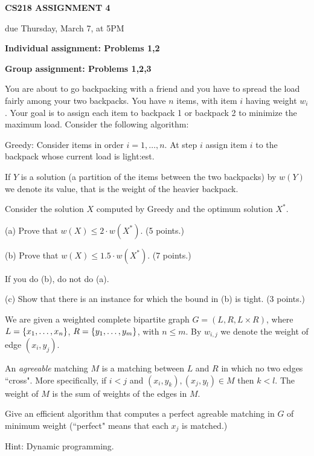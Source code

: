 \documentclass[11pt]{article}
\newcommand{\Greedy}{\mbox{\sc Greedy}}
\begin{document}
\centerline{\large \bf CS218 ASSIGNMENT 4}
\centerline{due Thursday, March 7, at 5PM}

\vskip 0.1in
\noindent
{\bf Individual assignment: Problems 1,2}

\noindent
{\bf Group assignment: Problems 1,2,3}

\vskip 0.1in



\begin{problem}
You are about to go backpacking with a friend and you have to spread the load fairly among your two backpacks. You have $n$ items, with item $i$ having weight $w_i$. Your goal is to assign each item to backpack 1 or backpack 2 to minimize the maximum load. Consider the following algorithm:
%
\begin{description}
\item{{\Greedy}:} Consider items in order $i=1,\dots,n$. At step $i$ assign item $i$ to the backpack whose current load is light:est.
\end{description}
%
If $Y$ is a solution (a partition of the items between the two backpacks) by $w(Y)$ we denote its value, that is the weight of the heavier backpack.

Consider the solution $X$ computed by {\Greedy} and the optimum solution $X^\ast$.

\noindent
(a) Prove that $w(X)\le 2\cdot w(X^\ast)$. (5 points.)

\noindent
(b) Prove that $w(X) \le 1.5\cdot w(X^\ast)$. (7 points.)

If you do (b), do not do (a).

\noindent
(c) Show that there is an instance for which the bound in (b) is tight.
(3 points.) \end{problem}


\begin{problem}
We are given a weighted complete bipartite graph $G = (L,R,L\times R)$, where $L = {\left\{ x_1,\dots,x_n \right\} }$, $R = {\left\{  y_1,\dots,y_m \right\} }$, with $n \le m$. By $w_{i,j}$ we denote the weight of edge $(x_i,y_j)$.

An \emph{agreeable} matching $M$ is a matching between $L$ and $R$ in which no two edges ``cross". More specifically, if $i<j$ and $(x_i,y_k), (x_j,y_l)\in M$ then $k < l$. The weight of $M$ is the sum of weights of the edges in $M$.

Give an efficient algorithm that computes a perfect agreable matching in $G$ of minimum weight (``perfect" means that each $x_j$ is matched.)

\noindent Hint: Dynamic programming.
\end{problem}
\end{document}
